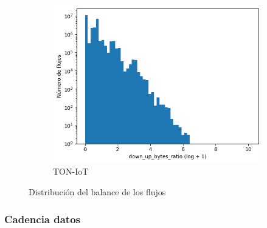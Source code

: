 \begin{figure}[H]
\begin{subfigure}[b]{0.32\textwidth}
        \centering
        \includegraphics[width=\linewidth]{media/packet_pincer_toniot/down_up_bytes_ratio_log_x_log_y.png}
        \caption{TON-IoT}
    \end{subfigure}
       \caption{Distribución del balance de los flujos}
       \label{fig:packet_pincer_down_up_bytes_ratio}
\end{figure}

\subsubsection{Cadencia datos}

